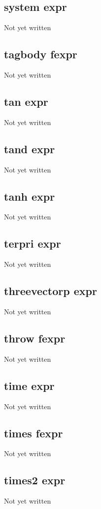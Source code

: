 \documentclass[a4paper,11pt]{article}
\begin{document}
\subsection{\ttfamily system expr}
Not yet written

\subsection{\ttfamily tagbody fexpr}
Not yet written

\subsection{\ttfamily tan expr}
Not yet written

\subsection{\ttfamily tand expr}
Not yet written

\subsection{\ttfamily tanh expr}
Not yet written

\subsection{\ttfamily terpri expr}
Not yet written

\subsection{\ttfamily threevectorp expr}
Not yet written

\subsection{\ttfamily throw fexpr}
Not yet written

\subsection{\ttfamily time expr}
Not yet written

\subsection{\ttfamily times fexpr}
Not yet written

\subsection{\ttfamily times2 expr}
Not yet written
\end{document}

